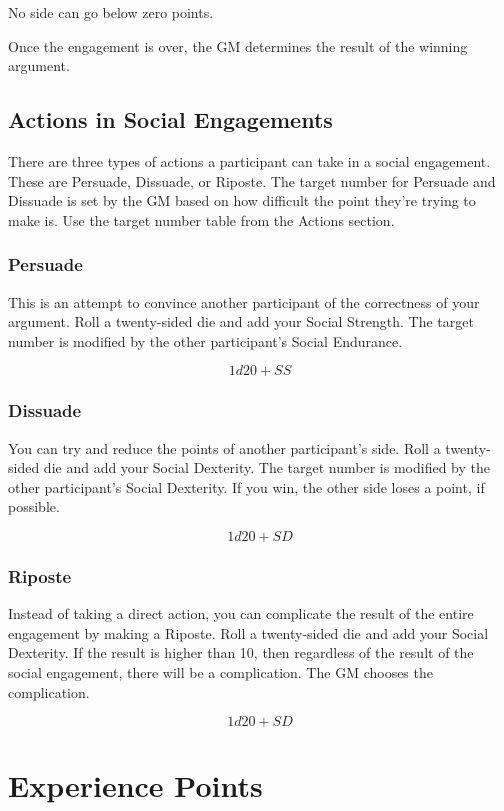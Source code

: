 \begin{multicols}{2}
No side can go below zero points.

Once the engagement is over, the GM determines the result of the winning argument.

\subsection{Actions in Social Engagements}

There are three types of actions a participant can take in a social engagement.
These are Persuade, Dissuade, or Riposte. The target number for Persuade and
Dissuade is set by the GM based on how difficult the point they're trying to
make is. Use the target number table from the Actions section.

\subsubsection{Persuade}

This is an attempt to convince another participant of the correctness of your argument. Roll a
twenty-sided die and add your Social Strength. The target number is modified by the other
participant's Social Endurance.

$$1d20 + SS$$

\subsubsection{Dissuade}

You can try and reduce the points of another participant's side. Roll a twenty-sided die
and add your Social Dexterity. The target number is modified by the other participant's
Social Dexterity. If you win, the other side loses a point, if possible.

$$1d20 + SD$$

\subsubsection{Riposte}

Instead of taking a direct action, you can complicate the result of the entire engagement
by making a Riposte. Roll a twenty-sided die and add your Social Dexterity. If the result
is higher than 10, then regardless of the result of the social engagement, there will be
a complication. The GM chooses the complication.

$$1d20 + SD$$

\section{Experience Points}


\end{multicols}
